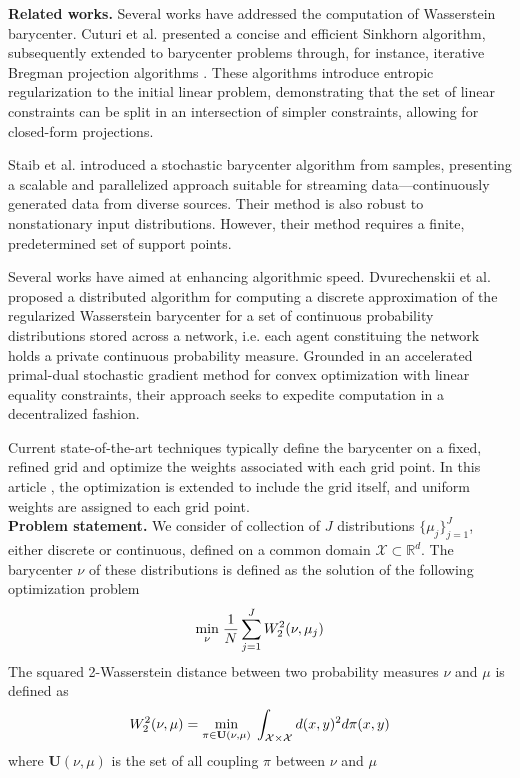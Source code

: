 \textbf{Related works.}  Several works have addressed the computation of Wasserstein barycenter. Cuturi et al. \cite{cuturi_sinkhorn_2013} presented a concise and efficient Sinkhorn algorithm, subsequently extended to barycenter problems through, for instance, iterative Bregman projection algorithms \cite{benamou_iterative_2014}. These algorithms introduce entropic regularization to the initial linear problem, demonstrating that the set of linear constraints can be split in an intersection of simpler constraints, allowing for closed-form projections.

Staib et al. \cite{staib_parallel_2017} introduced a stochastic barycenter algorithm from samples, presenting a scalable and parallelized approach suitable for streaming data—continuously generated data from diverse sources. Their method is also robust to nonstationary input distributions. However, their method requires a finite, predetermined set of support points. 

Several works have aimed at enhancing algorithmic speed. Dvurechenskii et al. \cite{dvurechenskii_decentralize_2018} proposed a distributed algorithm for computing a discrete approximation of the regularized Wasserstein barycenter for a set of continuous probability distributions stored across a network, i.e. each agent constituing the network holds a private continuous probability measure. Grounded in an accelerated primal-dual stochastic gradient method for convex optimization with linear equality constraints, their approach seeks to expedite computation in a decentralized fashion.

Current state-of-the-art techniques typically define the barycenter on a fixed, refined grid and optimize the weights associated with each grid point. In this article \cite{claici_stochastic_2018}, the optimization is extended to include the grid itself, and uniform weights are assigned to each grid point. \\ 

\textbf{Problem statement.} We consider of collection of $J$ distributions $\lbrace \mu_j \rbrace_{j=1}^J$, either discrete or continuous, defined on a common domain $\mathcal{X} \subset \mathbb{R}^d$. The barycenter $\nu$ of these distributions is defined as the solution of the following optimization problem 
$$ \underset{\nu}{\min}\;\frac{1}{N}\sum_{j=1}^{J} W_2^2(\nu, \mu_j) $$
The squared 2-Wasserstein distance between two probability measures $\nu$ and $\mu$ is defined as
\begin{equation}\label{eq:W2}
     W_2^2(\nu, \mu) = \underset{\pi \in \textbf{U}(\nu, \mu)}{\min}\; \int_{\mathcal{X}\times\mathcal{X}} d(x, y)^2 d\pi(x, y)
\end{equation}
where $\textbf{U}(\nu, \mu)$ is the set of all coupling $\pi$ between $\nu$ and $\mu$

